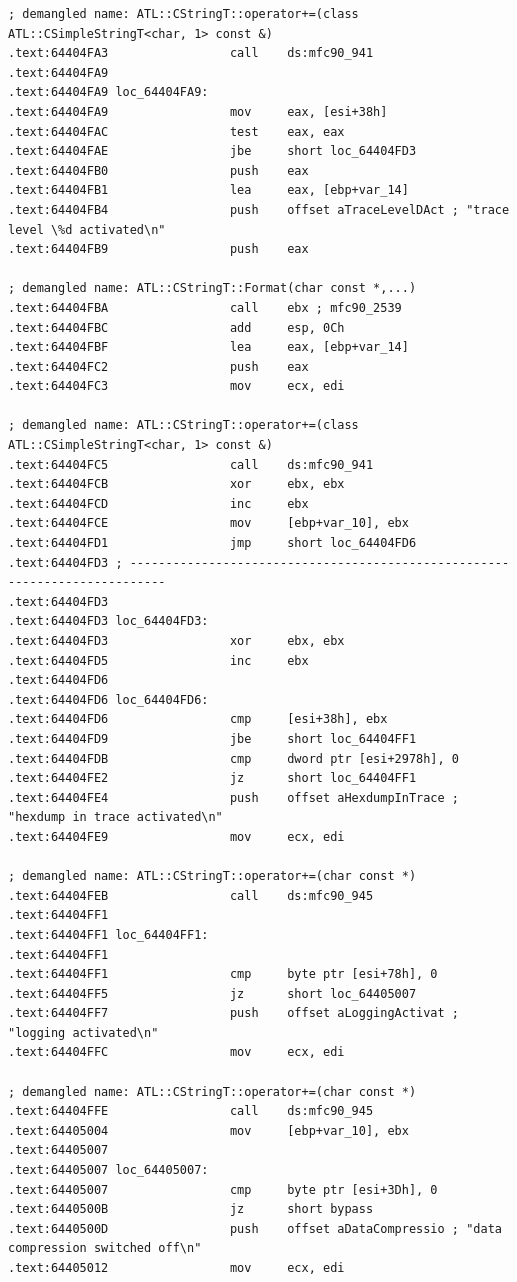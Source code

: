 \begin{lstlisting}
; demangled name: ATL::CStringT::operator+=(class ATL::CSimpleStringT<char, 1> const &)
.text:64404FA3                 call    ds:mfc90_941
.text:64404FA9
.text:64404FA9 loc_64404FA9:
.text:64404FA9                 mov     eax, [esi+38h]
.text:64404FAC                 test    eax, eax
.text:64404FAE                 jbe     short loc_64404FD3
.text:64404FB0                 push    eax
.text:64404FB1                 lea     eax, [ebp+var_14]
.text:64404FB4                 push    offset aTraceLevelDAct ; "trace level \%d activated\n"
.text:64404FB9                 push    eax

; demangled name: ATL::CStringT::Format(char const *,...)
.text:64404FBA                 call    ebx ; mfc90_2539
.text:64404FBC                 add     esp, 0Ch
.text:64404FBF                 lea     eax, [ebp+var_14]
.text:64404FC2                 push    eax
.text:64404FC3                 mov     ecx, edi

; demangled name: ATL::CStringT::operator+=(class ATL::CSimpleStringT<char, 1> const &)
.text:64404FC5                 call    ds:mfc90_941
.text:64404FCB                 xor     ebx, ebx
.text:64404FCD                 inc     ebx
.text:64404FCE                 mov     [ebp+var_10], ebx
.text:64404FD1                 jmp     short loc_64404FD6
.text:64404FD3 ; ---------------------------------------------------------------------------
.text:64404FD3
.text:64404FD3 loc_64404FD3:
.text:64404FD3                 xor     ebx, ebx
.text:64404FD5                 inc     ebx
.text:64404FD6
.text:64404FD6 loc_64404FD6:
.text:64404FD6                 cmp     [esi+38h], ebx
.text:64404FD9                 jbe     short loc_64404FF1
.text:64404FDB                 cmp     dword ptr [esi+2978h], 0
.text:64404FE2                 jz      short loc_64404FF1
.text:64404FE4                 push    offset aHexdumpInTrace ; "hexdump in trace activated\n"
.text:64404FE9                 mov     ecx, edi

; demangled name: ATL::CStringT::operator+=(char const *)
.text:64404FEB                 call    ds:mfc90_945
.text:64404FF1
.text:64404FF1 loc_64404FF1:
.text:64404FF1
.text:64404FF1                 cmp     byte ptr [esi+78h], 0
.text:64404FF5                 jz      short loc_64405007
.text:64404FF7                 push    offset aLoggingActivat ; "logging activated\n"
.text:64404FFC                 mov     ecx, edi

; demangled name: ATL::CStringT::operator+=(char const *)
.text:64404FFE                 call    ds:mfc90_945
.text:64405004                 mov     [ebp+var_10], ebx
.text:64405007
.text:64405007 loc_64405007:
.text:64405007                 cmp     byte ptr [esi+3Dh], 0
.text:6440500B                 jz      short bypass
.text:6440500D                 push    offset aDataCompressio ; "data compression switched off\n"
.text:64405012                 mov     ecx, edi


\end{lstlisting}
